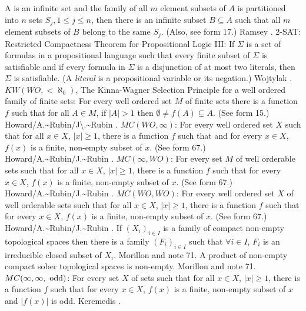 A is an infinite set and the family of all $m$ element subsets of $A$ is
partitioned into $n$ sets $S_{j}, 1\le j\le n$, then there is an infinite
subset $B\subseteq A$ such that all $m$ element subsets of $B$ belong to
the same $S_{j}$. (Also, see form 17.)  \ac{Ramsey} \cite{1929}.
\medskip
{}  2-SAT:  Restricted Compactness Theorem for
Propositional Logic III:   If $\Sigma$ is a set of formulas in a
propositional language such that every finite subset of $\Sigma$
is satisfiable and if every formula in $\Sigma$ is a disjunction
of at most two literals, then $\Sigma$ is satisfiable.
(A {\it literal} is a propositional variable or its negation.)
\ac{Wojtylak} \cite{1995}.
\medskip
{} $KW(WO,<\aleph_0)$,  The Kinna-Wagner Selection
Principle for a well ordered family of finite sets: For every well
ordered set $M$ of finite sets there is a function $f$ such that
for all $A\in M$, if $|A|>1$  then $\emptyset\neq f(A)\subsetneq A$.
(See form 15.) \ac{Howard/A.~Rubin/J\.~Rubin} \cite{1997}.
\medskip
{} $MC(WO,\infty)$: For  every well ordered set
$X$ such that for all $x\in X$, $|x|\ge 1$, there is a function $f$
such that and for every $x\in X$, $f(x)$ is a finite,
non-empty subset of $x$. (See form 67.) \ac{Howard/A.~Rubin/J.~Rubin}
\cite{1997}.
\medskip
{} $MC(\infty,WO)$: For  every set $M$ of well
orderable sets such that for all $x\in X$, $|x|\ge 1$, there is a function
$f$ such that for every $x\in X$, $f(x)$ is a finite, non-empty subset
of $x$.  (See form 67.) \ac{Howard/A.~Rubin/J.~Rubin} \cite{1997}.
\medskip
{} $MC(WO,WO)$: For every well ordered set $X$ of
well orderable sets such that for all $x\in X$, $|x|\ge 1$, there is a
function $f$ such that for every $x\in X$, $f(x)$ is a finite, non-empty
subset of $x$.  (See form 67.) \ac{Howard/A.~Rubin/J.~Rubin} \cite{1997}.
\medskip
{} If $(X_i)_{i\in I}$ is a family of compact
non-empty topological spaces then there is a family $(F_i)_{i\in I}$
such that $\forall i\in I$, $F_i$ is an irreducible closed subset of
$X_i$.  \ac{Morillon} \cite{1988} and note 71.
\medskip
{}  A product of non-empty compact sober
topological spaces is non-empty.  \ac{Morillon} \cite{1988} and note 71.
\medskip
{} $MC(\infty,\infty,\hbox{ odd})$: For every
set $X$ of  sets such that for all $x\in X$, $|x|\ge 1$, there is a
function $f$ such that  for every $x\in X$, $f(x)$ is a finite, non-empty
subset of $x$ and $|f(x)|$ is odd. \ac{Keremedis} \cite{1996a}.

